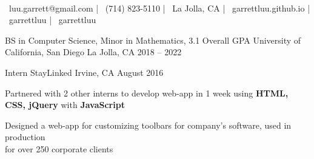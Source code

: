 \documentclass[]{awesome-cv}
\begin{document}
\begin{center}
	\vspace{-5mm}
	  \\
	\vspace{2mm}
  {\faEnvelope\ luu.garrett@gmail.com} | {\faMobile\ (714) 823-5110} |
  {\faMapMarker\ La Jolla, CA} | {\faLink\ garrettluu.github.io} |
  {\faGithub\ garrettluu} | {\faLinkedinSquare\ garrettluu}
\end{center}
\vspace{-3mm}
\begin{cventries}
	\cventry
	{BS in Computer Science, Minor in Mathematics, 3.1 Overall GPA}
	{University of California, San Diego}
	{La Jolla, CA}
	{2018 – 2022}
	{}
\end{cventries}

\vspace{-8mm}
\begin{cventries}
	\cventry
	{Intern}
	{StayLinked}
	{Irvine, CA}
	{August 2016}
	{\begin{cvitems}
    \item {Partnered with 2 other interns to develop web-app in 1 week using
      \textbf{HTML, CSS, jQuery} with \textbf{JavaScript}}
		\item {Designed a web-app for customizing toolbars for company’s software,
      used in production\\ for over 250 corporate clients}
		\end{cvitems}}
\end{cventries}
\end{document}

